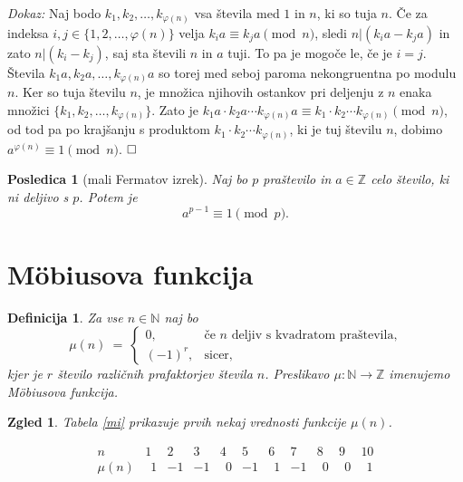 \documentclass[a4paper,12pt]{article}
\def\N{\mathbb{N}} %
\def\Z{\mathbb{Z}} %
\def\qed{$\hfill\Box$}   %
\newtheorem{posledica}{Posledica}
\newtheorem{definicija}{Definicija}
\newtheorem{zgled}{Zgled}
\begin{document}
\noindent
{\em Dokaz:\/} Naj bodo $k_1, k_2, \ldots, k_{\varphi(n)}$ vsa števila med $1$ in $n$, ki so tuja $n$. Če za indeksa $i,j \in \{1,2,\ldots,\varphi(n)\}$ velja $k_i a \equiv k_j a \!\!\!\pmod{n}$, sledi $n | (k_i a - k_j a)$ in zato $n | (k_i - k_j)$, saj sta števili $n$ in $a$ tuji. To pa je mogoče le, če je $i = j$. Števila  $k_1 a, k_2 a, \ldots, k_{\varphi(n)} a$ so torej med seboj paroma nekongruentna po modulu $n$. Ker so tuja številu $n$, je množica njihovih ostankov pri deljenju z $n$ enaka množici $\{k_1, k_2, \ldots, k_{\varphi(n)}\}$. Zato je $k_1 a\cdot k_2 a\cdots k_{\varphi(n)} a \equiv k_1\cdot k_2 \cdots k_{\varphi(n)} \pmod{n}$, od tod pa po krajšanju s produktom $ k_1\cdot k_2 \cdots k_{\varphi(n)}$, ki je tuj številu $n$, dobimo $a^{\varphi(n)} \equiv 1 \!\!\!\pmod{n}$. \qed

\begin{posledica}[mali Fermatov izrek]
Naj bo $p$ praštevilo in $a \in \Z$ celo število, ki ni deljivo s $p$. Potem je
\[
a^{p-1} \equiv 1 \pmod{p}.
\]
\end{posledica}



\section{M\"obiusova funkcija}


\begin{definicija}
Za vse $n \in \N$ naj bo
\[
\mu(n)\ =\ \left\{
\begin{array}{cl}
0, & \mbox{če\ } n \mbox{\ deljiv s kvadratom praštevila,} \\
(-1)^r, & \mbox{sicer,}
\end{array}
\right.
\]
kjer je $r$ število različnih prafaktorjev števila $n$.
Preslikavo $\mu: \N \to \Z$ imenujemo \em{M\"obiusova funkcija}.
\end{definicija}

\begin{zgled}
Tabela \ref{mi} prikazuje prvih nekaj vrednosti funkcije $\mu(n)$. 
\begin{table}[h]
\[
\begin{array}{c|*{10}{r}}
   n   & 1 & 2 & 3 & 4 & 5 & 6 & 7 & 8 & 9 & 10 \\
\hline
\mu(n) & \ \ 1 & -1 & -1 & \ \ 0 & -1 & \ \ 1 & -1 & \ \ 0 & \ \ 0 & \ \ 1
\end{array}
\]
\caption{Vrednosti funkcije $\mu(n)$}\label{mi}
\end{table}
\end{zgled}
\end{document}
